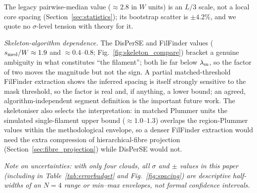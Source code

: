 \documentclass[usenatbib,twoside,twocolumn]{mnras}
\begin{document}
The legacy pairwise-median value ($\approx2.8$ in $W$ units) is an $L/3$ scale, not a local core spacing (Section~\ref{sec:statistics}); its bootstrap scatter is $\pm4.2\%$, and we quote no $\sigma$-level tension with theory for it.

\emph{Skeleton-algorithm dependence.} The DisPerSE and FilFinder values ($s_{\rm med}/W\approx1.9$ and $\approx0.4$--$0.8$; Fig.~\ref{fig:skeleton_compare}) bracket a genuine ambiguity in what constitutes ``the filament''; both lie far below $\lambda_{\rm m}$, so the factor of two moves the magnitude but not the sign. A partial matched-threshold FilFinder extraction shows the inferred spacing is itself strongly sensitive to the mask threshold, so the factor is real and, if anything, a lower bound; an agreed, algorithm-independent segment definition is the important future work. The skeletoniser also selects the interpretation: in matched Plummer units the simulated single-filament upper bound ($\approx1.0$--$1.3$) overlaps the region-Plummer values within the methodological envelope, so a denser FilFinder extraction would need the extra compression of hierarchical-fibre projection (Section~\ref{sec:fibre_projection}) while DisPerSE would not.

\noindent\emph{Note on uncertainties: with only four clouds, all $\sigma$ and $\pm$ values in this paper (including in Table~\ref{tab:errorbudget} and Fig.~\ref{fig:spacing}) are descriptive half-widths of an $N=4$ range or min--max envelopes, not formal confidence intervals.}
\end{document}
